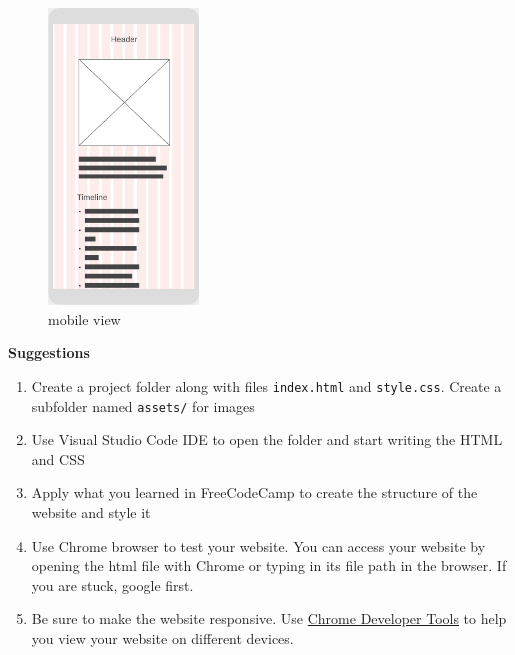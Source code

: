 \documentclass{42-en}
\begin{document}
\begin{figure}[H]
        \begin{center}
            \includegraphics[width=4cm]{wireframe_mobile.png}\\
            mobile view
        \end{center}
    \end{figure}
\textbf{Suggestions}
\begin{enumerate}
    \item Create a project folder along with files \texttt{index.html} and \texttt{style.css}. Create a subfolder named \texttt{assets/} for images
    \item Use Visual Studio Code IDE to open the folder and start writing the HTML and CSS
    \item Apply what you learned in FreeCodeCamp to create the structure of the website and style it
    \item Use Chrome browser to test your website. You can access your website by opening the html file with Chrome or typing in its file path in the browser. If you are stuck, google first.
    \item Be sure to make the website responsive. Use \href{https://developers.google.com/web/tools/chrome-devtools/device-mode}{Chrome Developer Tools} to help you view your website on different devices.
\end{enumerate}

\end{document}
